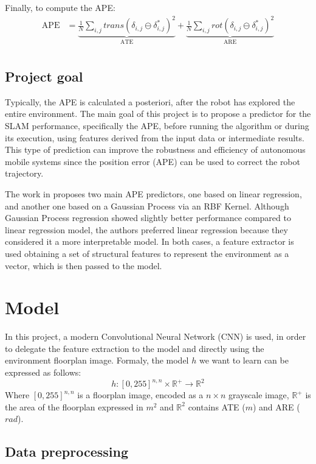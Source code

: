 \documentclass[a4paper]{article}
\begin{document}
Finally, to compute the APE: 
$$
\begin{aligned}
    \displaystyle
    \text{APE} &= \underbrace{\frac{1}{N}\sum_{i,j}trans(\delta_{i,j}\ominus\delta^*_{i,j})^2}_{\text{ATE}}+
                  \underbrace{\frac{1}{N}\sum_{i,j}rot(\delta_{i,j}\ominus\delta^*_{i,j})^2}_{\text{ARE}} \\
\end{aligned}
$$

\subsection{Project goal}
Typically, the APE is calculated a posteriori, after the robot has explored the entire environment. The main
goal of this project is to propose a predictor for the SLAM performance, specifically the APE, before running 
the algorithm or during its execution, using features derived from the input data or intermediate results.
This type of prediction can improve the robustness and efficiency of autonomous mobile systems since the 
position error (APE) can be used to correct the robot trajectory.

The work in \cite{Luperto} proposes two main APE predictors, one based on linear regression, and another one
based on a Gaussian Process via an RBF Kernel. Although Gaussian Process regression showed slightly better
performance compared to linear regression model, the authors preferred linear regression because they
considered it a more interpretable model. In both cases, a feature extractor is used \cite{Luperto2} obtaining
a set of structural features to represent the environment as a vector, which is then passed to the model.


\section{Model}
In this project, a modern Convolutional Neural Network (CNN) is used, in order to delegate the feature 
extraction to the model and directly using the environment floorplan image.
Formaly, the model $h$ we want to learn can be expressed as follows:
$$ h: [0,255]^{n,n} \times \mathbb{R}^+ \rightarrow \mathbb{R}^2 $$
Where $[0,255]^{n,n}$ is a floorplan image, encoded as a $n\times n$ grayscale image, $\mathbb{R}^+$ is the
area of the floorplan expressed in $m^2$ and $\mathbb{R}^2$ contains ATE ($m$)
and ARE ($rad$).

\subsection{Data preprocessing}

\clearpageS
\printbibliography
\end{document}
